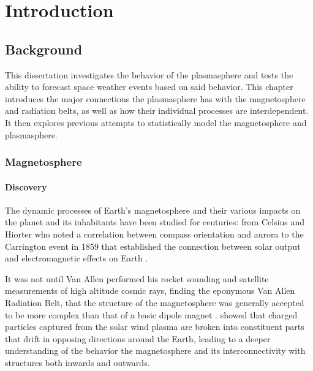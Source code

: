 
\chapter[Introduction]{Introduction}

\section{Background}

This dissertation investigates the behavior of the plasmasphere and tests the ability to forecast space weather events based on said behavior. This chapter introduces the major connections the plasmasphere has with the magnetosphere and radiation belts, as well as how their individual processes are interdependent.  It then explores previous attempts to statistically model the magnetosphere and plasmasphere.

\subsection{Magnetosphere}

\subsubsection{Discovery}
The dynamic processes of Earth's magnetosphere and their various impacts on the planet and its inhabitants have been studied for centuries: from Celsius and Hiorter who noted a correlation between compass orientation and aurora \citep{Maunder} to the Carrington event in 1859 that established the connection between solar output and electromagnetic effects on Earth \citep{Carrington}. 

It was not until Van Allen performed his rocket sounding and satellite measurements of high altitude cosmic rays, finding the eponymous Van Allen Radiation Belt, that the structure of the magnetosphere was generally accepted to be more complex than that of a basic dipole magnet \citep{MagnetoHistory}. \cite{Gold1959RingCurrent} showed that charged particles captured from the solar wind plasma are broken into constituent parts that drift in opposing directions around the Earth, leading to a deeper understanding of the behavior the magnetosphere and its interconnectivity with structures both inwards and outwards.

